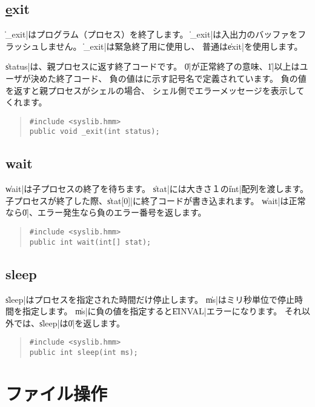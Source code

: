 \subsection{\ul exit}

\|_exit|はプログラム（プロセス）を終了します。
\|_exit|は入出力のバッファをフラッシュしません。
\|_exit|は緊急終了用に使用し、
普通は\|exit|を使用します。

\|status|は、親プロセスに返す終了コードです。
\|0|が正常終了の意味、\|1|以上はユーザが決めた終了コード、
負の値はに示す記号名で定義されています。
負の値を返すと親プロセスがシェルの場合、
シェル側でエラーメッセージを表示してくれます。

\begin{quote}
\begin{verbatim}
#include <syslib.hmm>
public void _exit(int status);
\end{verbatim}
\end{quote}

\subsection{wait}

\|wait|は子プロセスの終了を待ちます。
\|stat|には大きさ１の\|int|配列を渡します。
子プロセスが終了した際、\|stat[0]|に終了コードが書き込まれます。
\|wait|は正常なら\|0|、エラー発生なら負のエラー番号を返します。

\begin{quote}
\begin{verbatim}
#include <syslib.hmm>
public int wait(int[] stat);
\end{verbatim}
\end{quote}

\subsection{sleep}

\|sleep|はプロセスを指定された時間だけ停止します。
\|ms|はミリ秒単位で停止時間を指定します。
\|ms|に負の値を指定すると\|EINVAL|エラーになります。
それ以外では、\|sleep|は\|0|を返します。

\begin{quote}
\begin{verbatim}
#include <syslib.hmm>
public int sleep(int ms);
\end{verbatim}
\end{quote}

\section{ファイル操作}

